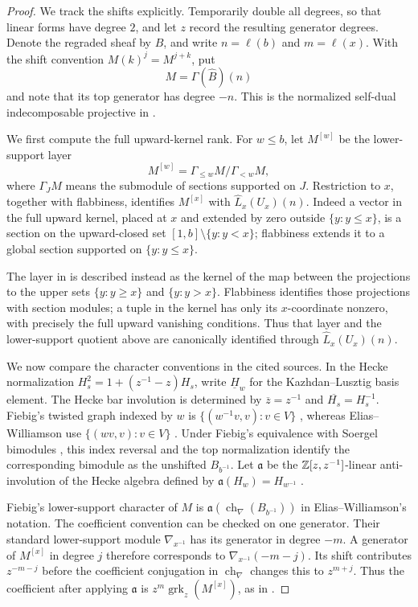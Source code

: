 \begin{proof}
We track the shifts explicitly.  Temporarily double all degrees, so that
linear forms have degree $2$, and let $z$ record the resulting generator
degrees.  Denote the regraded sheaf by $\widehat B$, and write
$n=\ell(b)$ and $m=\ell(x)$.  With the shift convention
$M(k)^j=M^{j+k}$, put
\[
 M=\Gamma(\widehat B)(n)
\]
and note that its top generator has degree $-n$.
This is the normalized self-dual indecomposable projective in
\cite[Corollary~6.5 and Theorem~6.1]{Fiebig08}.

We first compute the full upward-kernel rank.  For $w\le b$, let
$M^{[w]}$ be the lower-support layer
\[
 M^{[w]}=\Gamma_{\le w}M/\Gamma_{<w}M,
\]
where $\Gamma_JM$ means the submodule of sections supported on $J$.
Restriction to $x$, together with flabbiness, identifies $M^{[x]}$ with
$\widehat L_x(U_x)(n)$.  Indeed a vector in the full upward kernel, placed
at $x$ and extended by zero outside $\{y:y\le x\}$, is a section on the
upward-closed set $[1,b]\setminus\{y:y<x\}$; flabbiness extends it to a
global section supported on $\{y:y\le x\}$.

The layer in \cite[Section~2.4]{Fiebig08} is described instead as the
kernel of the map between the projections to the upper sets
$\{y:y\ge x\}$ and $\{y:y>x\}$. Flabbiness identifies those projections
with section modules; a tuple in the kernel has only its $x$-coordinate
nonzero, with precisely the full upward vanishing conditions.
Thus that layer and the lower-support quotient above are canonically
identified through $\widehat L_x(U_x)(n)$.

We now compare the character conventions in the cited sources.  In the
Hecke normalization $H_s^2=1+(z^{-1}-z)H_s$, write $\underline H_w$ for
the Kazhdan--Lusztig basis element.  The Hecke bar involution is determined
by $\overline z=z^{-1}$ and $\overline{H_s}=H_s^{-1}$.
Fiebig's twisted graph indexed by $w$
is $\{(w^{-1}v,v):v\in V\}$ \cite[Section~4]{Fiebig08},
whereas Elias--Williamson use $\{(wv,v):v\in V\}$
\cite[Section~3.5]{EW14}.
Under Fiebig's equivalence with Soergel bimodules
\cite[Theorem~6.3]{Fiebig08}, this index reversal and
the top normalization identify the corresponding bimodule as the unshifted
$B_{b^{-1}}$.  Let $\mathfrak a$ be the $\mathbb Z[z,z^{-1}]$-linear
anti-involution of the Hecke algebra defined by
$\mathfrak a(H_w)=H_{w^{-1}}$ \cite[Section~3.2]{EW14}.

Fiebig's lower-support character of $M$ is
$\mathfrak a(\operatorname{ch}_{\nabla}(B_{b^{-1}}))$ in
Elias--Williamson's notation.  The coefficient convention can be checked
on one generator.  Their standard lower-support module
$\nabla_{x^{-1}}$ has its generator in degree $-m$.  A generator of
$M^{[x]}$ in degree $j$ therefore corresponds to
$\nabla_{x^{-1}}(-m-j)$.  Its shift contributes $z^{-m-j}$ before the
coefficient conjugation in $\operatorname{ch}_{\nabla}$ changes this
to $z^{m+j}$.  Thus the coefficient after applying $\mathfrak a$ is
$z^m\operatorname{grk}_z(M^{[x]})$, as in
\cite[Section~8.2]{Fiebig08}.


\end{proof}
